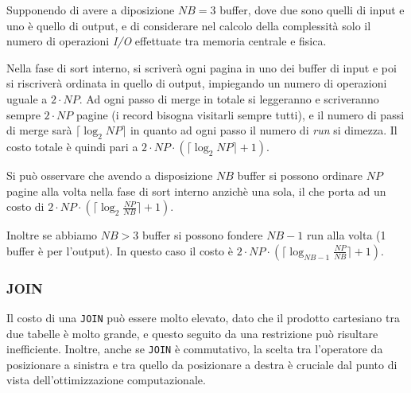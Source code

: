 Supponendo di avere a diposizione $NB = 3$ buffer, dove due sono quelli
di input e uno è quello di output, e di considerare nel calcolo della complessità
solo il numero di operazioni \emph{I/O} effettuate tra memoria centrale e fisica.

Nella fase di sort interno, si scriverà ogni pagina in uno dei buffer di input
e poi si riscriverà ordinata in quello di output, impiegando un numero di operazioni uguale
a $2 \cdot NP$. Ad ogni passo di merge in totale si leggeranno e scriveranno
sempre $2 \cdot NP$ pagine (i record bisogna visitarli sempre tutti), e il numero di passi di merge sarà $\lceil \log_{2}NP \rceil$ in quanto
ad ogni passo il numero di \emph{run} si dimezza. Il costo totale è quindi
pari a $2 \cdot NP \cdot (\lceil \log_{2}NP \rceil + 1)$.

Si può osservare che avendo a disposizione $NB$ buffer si possono ordinare $NP$ pagine
alla volta nella fase di sort interno anzichè una sola, il che porta ad un costo di $2 \cdot NP \cdot (\lceil \log_{2}{\frac{NP}{NB}} \rceil + 1)$.

Inoltre se abbiamo $NB > 3$ buffer si possono fondere $NB - 1$ run alla volta (1 buffer è per l'output).
In questo caso il costo è $2 \cdot NP \cdot (\lceil \log_{NB - 1}{\frac{NP}{NB}} \rceil + 1)$.

\subsubsection{JOIN}

Il costo di una \verb|JOIN| può essere molto elevato, dato che il prodotto
cartesiano tra due tabelle è molto grande, e questo seguito da una restrizione
può risultare inefficiente. Inoltre, anche se \verb|JOIN| è commutativo, la scelta
tra l'operatore da posizionare a sinistra e tra quello da posizionare a destra è cruciale
dal punto di vista dell'ottimizzazione computazionale.


